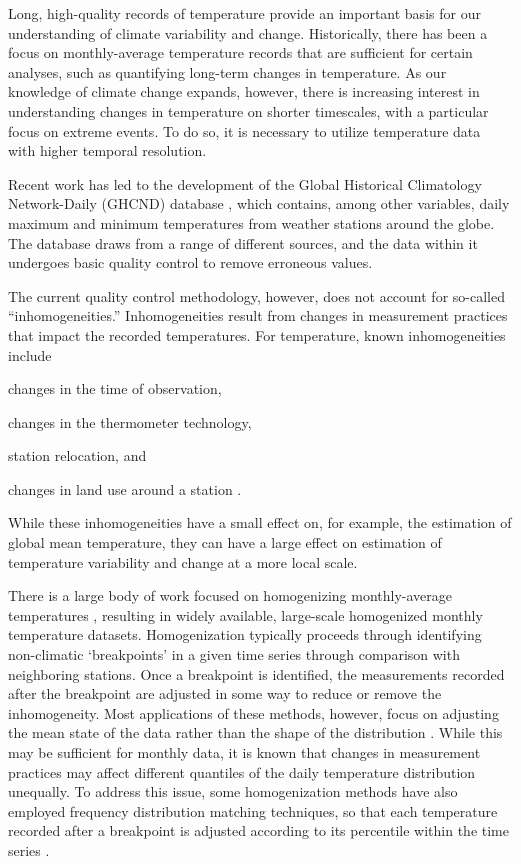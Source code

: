 \documentclass[12pt]{article}
\begin{document}
Long, high-quality records of temperature provide an important basis for our understanding of climate variability and change. Historically, there has been a focus on monthly-average temperature records that are sufficient for certain analyses, such as quantifying long-term changes in temperature. As our knowledge of climate change expands, however, there is increasing interest in understanding changes in temperature on shorter timescales, with a particular focus on extreme events. To do so, it is necessary to utilize temperature data with higher temporal resolution. 

Recent work has led to the development of the Global Historical Climatology Network-Daily (GHCND) database \citep{menne2012overview}, which contains, among other variables, daily maximum and minimum temperatures from weather stations around the globe. The database draws from a range of different sources, and the data within it undergoes basic quality control to remove erroneous values. 

The current quality control methodology, however, does not account for so-called ``inhomogeneities.'' Inhomogeneities result from changes in measurement practices that impact the recorded temperatures. For temperature, known inhomogeneities include 
\begin{flatlist}
    \item changes in the time of observation, 
    \item changes in the thermometer technology, 
    \item station relocation, and 
    \item changes in land use around a station \citep{menne2009us}.
\end{flatlist}
While these inhomogeneities have a small effect on, for example, the estimation of global mean temperature, they can have a large effect on estimation of temperature variability and change at a more local scale.

There is a large body of work focused on homogenizing monthly-average temperatures \citep[e.g.,][]{karl1986model, easterling1996development, peterson1998homogeneity, ducre2003comparison, menne2009homogenization, vincent2012second}, resulting in widely available, large-scale homogenized monthly temperature datasets. 
Homogenization typically proceeds through identifying non-climatic `breakpoints' in a given time series through comparison with neighboring stations.
Once a breakpoint is identified, the measurements recorded after the breakpoint are adjusted in some way to reduce or remove the inhomogeneity.
Most applications of these methods, however, focus on adjusting the mean state of the data rather than the shape of the distribution \citep[see][and references therein]{della2006method}.
While this may be sufficient for monthly data, it is known that changes in measurement practices may affect different quantiles of the daily temperature distribution unequally.
To address this issue, some homogenization methods have also employed frequency distribution matching techniques, so that each temperature recorded after a breakpoint is adjusted according to its percentile within the time series \citep{della2006method, trewin2013daily}. 
\end{document}
